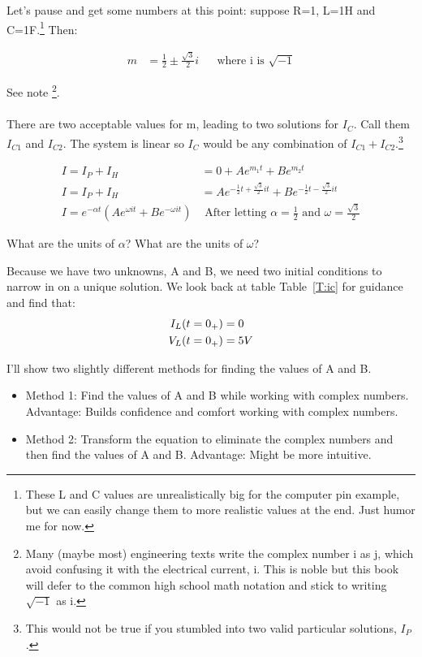 Let's pause and get some numbers at this point: suppose R=1, L=1H and C=1F.\footnote{These L and C values are unrealistically big for the computer pin example, but we can easily change them to more realistic values at the end. Just humor me for now.}  Then:\par

\begin{align}
m&=\frac{1}{2}\pm \frac{\sqrt{3}}{2} i &&\text{where i is $\sqrt{-1}$}
\end{align} 

See note \footnote{Many (maybe most) engineering texts write the complex number i as j, which avoid confusing it with the electrical current, i.  This is noble but this book will defer to the common high school math notation and stick to writing $\sqrt{-1}$ as i.}.\\
\\
There are two acceptable values for m, leading to two solutions for $I_C$. Call them $I_{C1}$ and $I_{C2}$. The system is linear so $I_C$ would be any combination of $I_{C1}+I_{C2}$.\footnote{This would not be true if you stumbled into two valid particular solutions, $I_P$.} \par

\begin{align*}
I=I_P+I_H&=0+Ae^{m_1t}+Be^{m_2t} \\
I=I_P+I_H&=Ae^{-\frac{1}{2}t + \frac{\sqrt{3}}{2} it}+Be^{-\frac{1}{2}t - \frac{\sqrt{3}}{2} it} \\
I=e^{-\alpha t}(Ae^{\omega it}+Be^{-\omega it}) &\text{ After letting $\alpha=\frac{1}{2}$ and $\omega=\frac{\sqrt{3}}{2}$}
\end{align*}

\begin{blevel}
What are the units of $\alpha$? What are the units of $\omega$?
\end{blevel}

Because we have two unknowns, A and B, we need two initial conditions to narrow in on a unique solution. We look back at table Table~\ref{T:ic} for guidance and find that:
\begin{align}
I_L(t=0_+)&=0 \label{E:IC1}\\
V_L(t=0_+)&=5V \notag
\end{align}
\par
I'll show two slightly different methods for finding the values of A and B.
\begin{itemize}
\item Method 1: Find the values of A and B while working with complex numbers. Advantage: Builds confidence and comfort working with complex numbers.
\item Method 2: Transform the equation to eliminate the complex numbers and then find the values of A and B. Advantage: Might be more intuitive.
\end{itemize}

